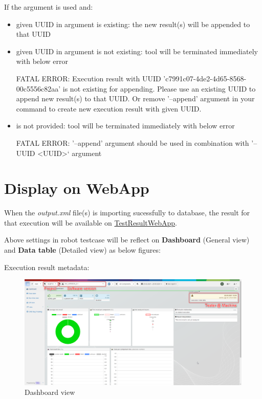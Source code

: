 If the argument  is used and:
\begin{itemize}
  \item given UUID in  argument is existing: the new result(s) will be appended to that UUID
  \item given UUID in  argument is not existing: tool will be terminated immediately with below error
\begin{robotlog}
FATAL ERROR: Execution result with UUID 'c7991c07-4de2-4d65-8568-00c5556c82aa' is not existing for appending.
             Please use an existing UUID to append new result(s) to that UUID.
             Or remove '--append' argument in your command to create new execution result with given UUID.
\end{robotlog}
  \item {} is not provided: tool will be terminated immediately with below error
\begin{robotlog}
FATAL ERROR: '--append' argument should be used in combination with '--UUID <UUID>` argument
\end{robotlog}
\end{itemize} 


\newpage
\hypertarget{description-display-on-webapp}{%
\section{Display on WebApp}\label{description-display-on-webapp}}

When the \emph{output.xml} file(s) is importing sucessfully to database, the result for that 
execution will be available on
\href{https://github.com/test-fullautomation/testresultwebapp}{TestResultWebApp}.

Above settings in robot testcase will be reflect on \textbf{Dashboard} (General view) and 
\textbf{Data table} (Detailed view) as below figures:

Execution result metadata:

\begin{figure}[h!]
  \includegraphics[width=1\linewidth]{./pictures/Dashboard.png}
  \caption{Dashboard view}
\end{figure}

